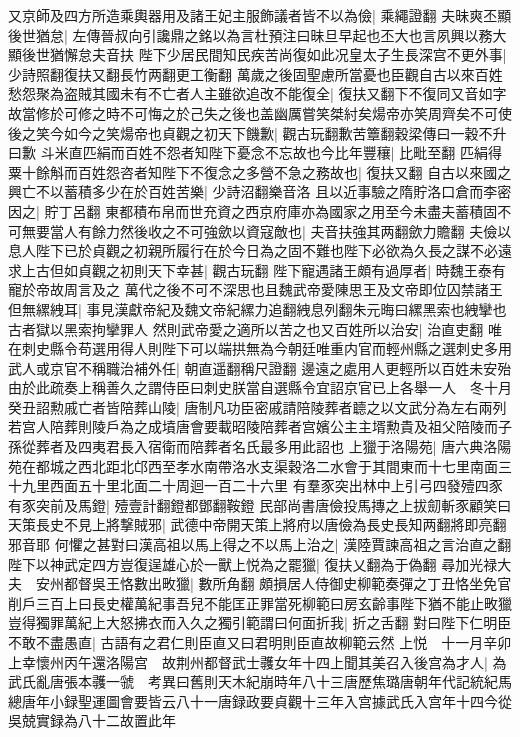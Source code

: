 又京師及四方所造乘輿器用及諸王妃主服飾議者皆不以為儉|{
	乘繩證翻}
夫昧爽丕顯後世猶怠|{
	左傳晉叔向引讒鼎之銘以為言杜預注曰昧旦早起也丕大也言夙興以務大顯後世猶懈怠夫音扶}
陛下少居民間知民疾苦尚復如此况皇太子生長深宫不更外事|{
	少詩照翻復扶又翻長竹两翻更工衡翻}
萬歲之後固聖慮所當憂也臣觀自古以來百姓愁怨聚為盗賊其國未有不亡者人主雖欲追改不能復全|{
	復扶又翻下不復同又音如字}
故當修於可修之時不可悔之於己失之後也盖幽厲嘗笑桀紂矣煬帝亦笑周齊矣不可使後之笑今如今之笑煬帝也貞觀之初天下饑歉|{
	觀古玩翻歉苦簟翻穀梁傳曰一穀不升曰歉}
斗米直匹絹而百姓不怨者知陛下憂念不忘故也今比年豐穰|{
	比毗至翻}
匹絹得粟十餘斛而百姓怨咨者知陛下不復念之多營不急之務故也|{
	復扶又翻}
自古以來國之興亡不以蓄積多少在於百姓苦樂|{
	少詩沼翻樂音洛}
且以近事驗之隋貯洛口倉而李密因之|{
	貯丁呂翻}
東都積布帛而世充資之西京府庫亦為國家之用至今未盡夫蓄積固不可無要當人有餘力然後收之不可強歛以資寇敵也|{
	夫音扶強其两翻歛力贍翻}
夫儉以息人陛下已於貞觀之初親所履行在於今日為之固不難也陛下必欲為久長之謀不必遠求上古但如貞觀之初則天下幸甚|{
	觀古玩翻}
陛下寵遇諸王頗有過厚者|{
	時魏王泰有寵於帝故周言及之}
萬代之後不可不深思也且魏武帝愛陳思王及文帝即位囚禁諸王但無縲絏耳|{
	事見漢獻帝紀及魏文帝紀縲力追翻絏息列翻朱元晦曰縲黑索也絏攣也古者獄以黑索拘攣罪人}
然則武帝愛之適所以苦之也又百姓所以治安|{
	治直吏翻}
唯在刺史縣令苟選用得人則陛下可以端拱無為今朝廷唯重内官而輕州縣之選刺史多用武人或京官不稱職治補外任|{
	朝直遥翻稱尺證翻}
邊遠之處用人更輕所以百姓未安殆由於此疏奏上稱善久之謂侍臣曰刺史朕當自選縣令宜詔京官已上各舉一人　冬十月癸丑詔勲戚亡者皆陪葬山陵|{
	唐制凡功臣密戚請陪陵葬者聼之以文武分為左右兩列若宫人陪葬則陵戶為之成墳唐會要載昭陵陪葬者宫嬪公主主壻勲貴及祖父陪陵而子孫從葬者及四夷君長入宿衛而陪葬者名氏最多用此詔也}
上獵于洛陽苑|{
	唐六典洛陽苑在都城之西北距北邙西至孝水南帶洛水支渠穀洛二水會于其間東而十七里南面三十九里西面五十里北面二十周迴一百二十六里}
有羣豕突出林中上引弓四發殪四豕有豕突前及馬鐙|{
	殪壹計翻鐙都鄧翻鞍鐙}
民部尚書唐儉投馬摶之上拔劎斬豕顧笑曰天策長史不見上將撃賊邪|{
	武德中帝開天策上將府以唐儉為長史長知两翻將即亮翻邪音耶}
何懼之甚對曰漢高祖以馬上得之不以馬上治之|{
	漢陸賈諫高祖之言治直之翻}
陛下以神武定四方豈復逞雄心於一獸上悦為之罷獵|{
	復扶乂翻為于偽翻}
尋加光禄大夫　安州都督吳王恪數出畋獵|{
	數所角翻}
頗損居人侍御史柳範奏彈之丁丑恪坐免官削戶三百上曰長史權萬紀事吾兒不能匡正罪當死柳範曰房玄齡事陛下猶不能止畋獵豈得獨罪萬紀上大怒拂衣而入久之獨引範謂曰何面折我|{
	折之舌翻}
對曰陛下仁明臣不敢不盡愚直|{
	古語有之君仁則臣直又曰君明則臣直故柳範云然}
上悦　十一月辛卯上幸懷州丙午還洛陽宫　故荆州都督武士彠女年十四上聞其美召入後宫為才人|{
	為武氏亂唐張本彠一虢　考異曰舊則天木紀崩時年八十三唐歷焦璐唐朝年代記統紀馬總唐年小録聖運圖會要皆云八十一唐録政要貞觀十三年入宫據武氏入宫年十四今從吳兢實録為八十二故置此年}


